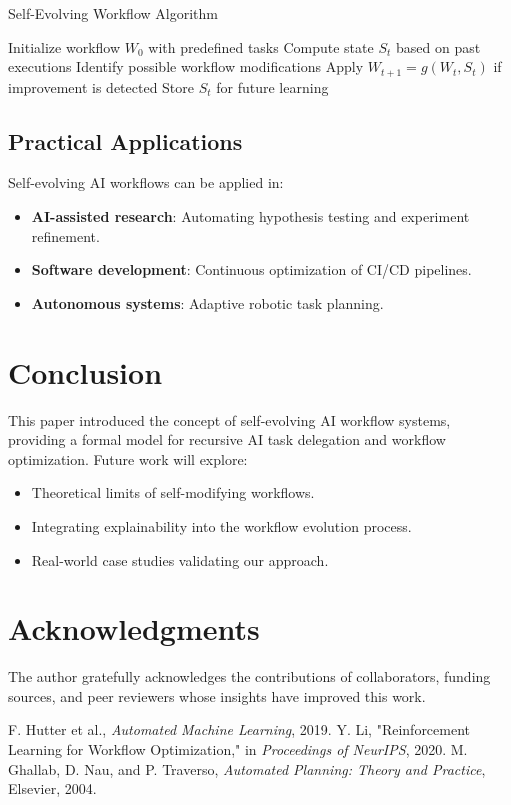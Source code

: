 \documentclass{article}
\begin{document}
\begin{algorithm}
\caption{Self-Evolving Workflow Algorithm}
\begin{algorithmic}
    \STATE Initialize workflow $W_0$ with predefined tasks
        \STATE Compute state $S_t$ based on past executions
        \STATE Identify possible workflow modifications
        \STATE Apply $W_{t+1} = g(W_t, S_t)$ if improvement is detected
        \STATE Store $S_t$ for future learning
    \ENDFOR
\end{algorithmic}
\end{algorithm}

\subsection{Practical Applications}

Self-evolving AI workflows can be applied in:
\begin{itemize}
    \item \textbf{AI-assisted research}: Automating hypothesis testing and experiment refinement.
    \item \textbf{Software development}: Continuous optimization of CI/CD pipelines.
    \item \textbf{Autonomous systems}: Adaptive robotic task planning.
\end{itemize}

\section{Conclusion}

This paper introduced the concept of self-evolving AI workflow systems, providing a formal model for recursive AI task delegation and workflow optimization. Future work will explore:
\begin{itemize}
    \item Theoretical limits of self-modifying workflows.
    \item Integrating explainability into the workflow evolution process.
    \item Real-world case studies validating our approach.
\end{itemize}

\section*{Acknowledgments}
The author gratefully acknowledges the contributions of collaborators, funding sources, and peer reviewers whose insights have improved this work.

\begin{thebibliography}{9}
 F. Hutter et al., \textit{Automated Machine Learning}, 2019.
 Y. Li, "Reinforcement Learning for Workflow Optimization," in \textit{Proceedings of NeurIPS}, 2020.
 M. Ghallab, D. Nau, and P. Traverso, \textit{Automated Planning: Theory and Practice}, Elsevier, 2004.
\end{thebibliography}
\end{document}
